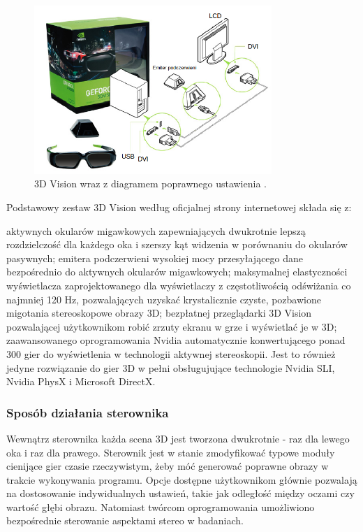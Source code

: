 \begin{figure}[H]
		\centering
 		\includegraphics[width=9cm]{3dVision.png}
    	\caption{3D Vision wraz z diagramem poprawnego ustawienia \cite{3dVisionPic}.}
 		\label{rys4}
\end{figure}
Podstawowy zestaw 3D Vision według oficjalnej strony internetowej \cite{3dVisionInfo} składa się z: 
\begin{itemize}
\itemi aktywnych okularów migawkowych zapewniających dwukrotnie lepszą rozdzielczość dla każdego oka i szerszy kąt widzenia w porównaniu do okularów pasywnych;
\itemi emitera podczerwieni wysokiej mocy przesyłającego dane bezpośrednio do aktywnych okularów migawkowych;
\itemi maksymalnej elastyczności wyświetlacza zaprojektowanego dla wyświetlaczy z częstotliwością odświżania co najmniej 120 Hz, pozwalających uzyskać krystalicznie czyste, pozbawione migotania stereoskopowe obrazy 3D;
\itemi bezpłatnej przeglądarki 3D Vision pozwalającej użytkownikom robić zrzuty ekranu w grze i wyświetlać je w 3D;
\itemi zaawansowanego oprogramowania Nvidia automatycznie konwertującego ponad 300 gier do wyświetlenia w technologii aktywnej stereoskopii. Jest to również jedyne rozwiązanie do gier 3D w pełni obsługujujące technologie Nvidia SLI, Nvidia PhysX i Microsoft DirectX.
\end{itemize}

\subsubsection{Sposób działania sterownika}
Wewnątrz sterownika każda scena 3D jest tworzona dwukrotnie - raz dla lewego oka i raz dla prawego. Sterownik jest w stanie zmodyfikować typowe moduły cienijące gier czasie rzeczywistym, żeby móć generować poprawne obrazy w trakcie wykonywania programu. Opcje dostępne użytkownikom głównie pozwalają na dostosowanie indywidualnych ustawień, takie jak odległość między oczami czy wartość głębi obrazu. Natomiast twórcom oprogramowania umożliwiono bezpośrednie sterowanie aspektami stereo w badaniach. 

